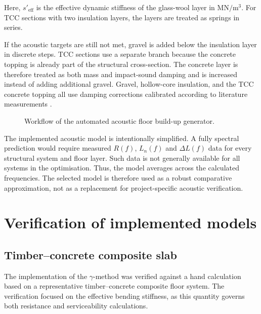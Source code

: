 Here, \(s'_{\mathrm{eff}}\) is the effective dynamic stiffness of the glass-wool layer in \(\mathrm{MN/m^3}\). For TCC sections with two insulation layers, the layers are treated as springs in series.

\newpage
If the acoustic targets are still not met, gravel is added below the insulation layer in discrete steps. TCC sections use a separate branch because the concrete topping is already part of the structural cross-section. The concrete layer is therefore treated as both mass and impact-sound damping and is increased instead of adding additional gravel. Gravel, hollow-core insulation, and the TCC concrete topping all use damping corrections calibrated according to literature measurements \cite{BauphysikKalender}.

\begin{figure}[htbp]
\centering
\resizebox{\textwidth}{!}{%
    
}
\caption{Workflow of the automated acoustic floor build-up generator.}
\label{fig:acoustic_floor_generator}
\end{figure}

The implemented acoustic model is intentionally simplified. A fully spectral prediction would require measured $R(f)$, $L_n(f)$ and $\Delta L(f)$ data for every structural system and floor layer. Such data is not generally available for all systems in the optimisation. Thus, the model averages across the calculated frequencies. The selected model is therefore used as a robust comparative approximation, not as a replacement for project-specific acoustic verification.


\section{Verification of implemented models}

\subsection{Timber--concrete composite slab}

The implementation of the $\gamma$-method was verified against a hand calculation based on a representative timber--concrete composite floor system. The verification focused on the effective bending stiffness, as this quantity governs both resistance and serviceability calculations.

